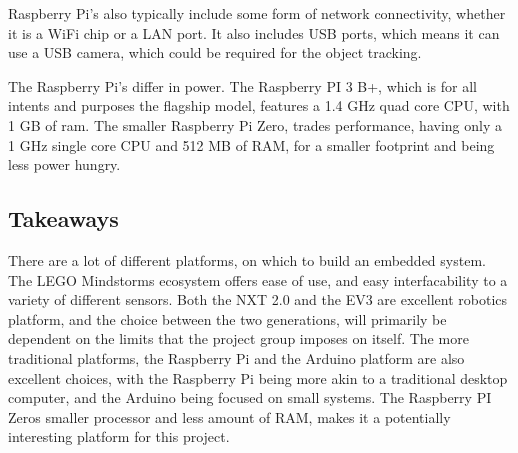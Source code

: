 Raspberry Pi's also typically include some form of network connectivity, whether it is a WiFi chip or a LAN port.
It also includes USB ports, which means it can use a USB camera, which could be required for the object tracking.

The Raspberry Pi's differ in power.
The Raspberry PI 3 B+, which is for all intents and purposes the flagship model, features a 1.4 GHz quad core CPU, with 1 GB of ram.
The smaller Raspberry Pi Zero, trades performance, having only a 1 GHz single core CPU and 512 MB of RAM, for a smaller footprint and being less power hungry.

\subsection{Takeaways}
There are a lot of different platforms, on which to build an embedded system.
The LEGO Mindstorms ecosystem offers ease of use, and easy interfacability to a variety of different sensors.
Both the NXT 2.0 and the EV3 are excellent robotics platform, and the choice between the two generations, will primarily be dependent on the limits that the project group imposes on itself.
The more traditional platforms, the Raspberry Pi and the Arduino platform are also excellent choices, with the Raspberry Pi being more akin to a traditional desktop computer, and the Arduino being focused on small systems.
The Raspberry PI Zeros smaller processor and less amount of RAM, makes it a potentially interesting platform for this project.

